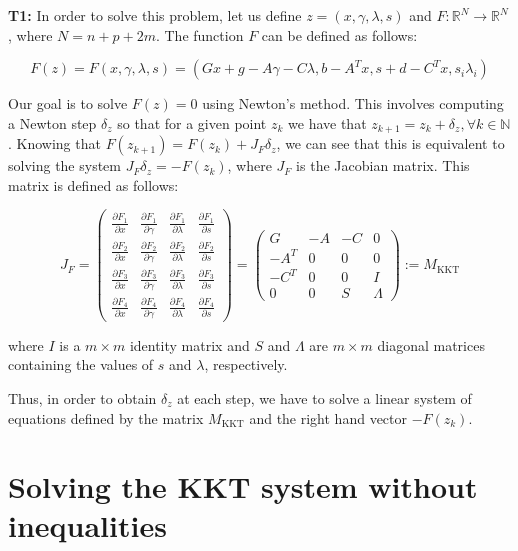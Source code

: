 \documentclass[11pt,a4paper]{article}
\begin{document}
\noindent \textbf{T1:} In order to solve this problem, let us define $z = (x, \gamma, \lambda, s)$ and
$F: \mathbb{R}^N \rightarrow \mathbb{R}^N$, where $N = n + p + 2m$. The function $F$ can be defined
as follows:

\[
  F(z) = F(x, \gamma, \lambda, s) = (Gx + g - A\gamma - C\lambda, b - A^T x, s + d - C^Tx, s_i \lambda_i)
\]

Our goal is to solve $F(z) = 0$ using Newton's method. This involves computing a Newton step
$\delta_z$ so that for a given point $z_k$ we have that $z_{k+1} = z_k + \delta_z, \forall k \in \mathbb{N}$.
Knowing that $F(z_{k+1}) = F(z_k) + J_F\delta_z$, we can see that this is equivalent to
solving the system $J_F\delta_z = -F(z_k)$, where $J_F$ is the Jacobian matrix.
This matrix is defined as follows:

\[
  J_F =
  \begin{pmatrix}
    \frac{\partial F_1}{\partial x} & \frac{\partial F_1}{\partial \gamma} &
    \frac{\partial F_1}{\partial \lambda} & \frac{\partial F_1}{\partial s} \\
    \frac{\partial F_2}{\partial x} & \frac{\partial F_2}{\partial \gamma} &
    \frac{\partial F_2}{\partial \lambda} & \frac{\partial F_2}{\partial s} \\
    \frac{\partial F_3}{\partial x} & \frac{\partial F_3}{\partial \gamma} &
    \frac{\partial F_3}{\partial \lambda} & \frac{\partial F_3}{\partial s} \\
    \frac{\partial F_4}{\partial x} & \frac{\partial F_4}{\partial \gamma} &
    \frac{\partial F_4}{\partial \lambda} & \frac{\partial F_4}{\partial s}
  \end{pmatrix}
  =
  \begin{pmatrix}
    G & -A & -C & 0 \\
    -A^T & 0 & 0 & 0 \\
    -C^T & 0 & 0 & I \\
    0 & 0 & S & \Lambda
  \end{pmatrix}
  :=
  M_{\text{KKT}}
\]

\noindent where $I$ is a $m \times m$ identity matrix and $S$ and $\Lambda$ are $m \times m$
diagonal matrices containing the values of $s$ and $\lambda$, respectively.

Thus, in order to obtain $\delta_z$ at each step, we have to solve a linear system of equations
defined by the matrix $M_{\text{KKT}}$ and the right hand vector $-F(z_k)$.


\section{Solving the KKT system without inequalities}
\end{document}
